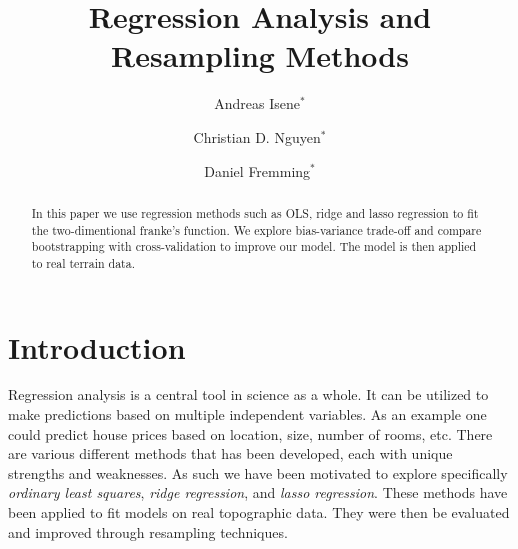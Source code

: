 \documentclass[aps,rmp,reprint,amsmath,amssymb,graphicx,longbibliography]{revtex4-1}
\begin{document}

\title{Regression Analysis and Resampling Methods}

\author{Andreas Isene$^*$}
\author{Christian D. Nguyen$^*$}
\author{Daniel Fremming$^*$}



\begin{abstract}
     In this paper we use regression methods such as OLS, ridge and lasso regression to fit the two-dimentional franke's function. We explore bias-variance trade-off and compare bootstrapping with cross-validation to improve our model. The model is then applied to real terrain data.
\end{abstract}

\maketitle
\def\thefootnote{*}\def\thefootnote{\arabic{footnote}}
\def\thefootnote{$^1$}

\tableofcontents






\section{Introduction}
Regression analysis is a central tool in science as a whole. It can be utilized to make predictions based on multiple independent variables. As an example one could predict house prices based on location, size, number of rooms, etc. There are various different methods that has been developed, each with unique strengths and weaknesses. As such we have been motivated to explore specifically \textit{ordinary least squares}, \textit{ridge regression}, and \textit{lasso regression}. These methods have been applied to fit models on real topographic data. They were then be evaluated and improved through resampling techniques. 
\end{document}
